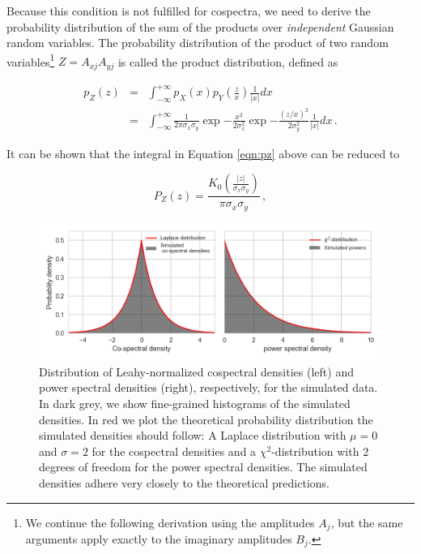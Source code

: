 \documentclass[12pt]{emulateapj}
\begin{document}
Because this condition is not fulfilled for cospectra, we need to derive the probability distribution of the sum of the products over \textit{independent} Gaussian random variables. The probability distribution of the product of two random variables\footnote{We continue the following derivation using the amplitudes $A_j$, but the same arguments apply exactly to the imaginary amplitudes $B_j$.} $Z = A_{xj}A_{yj}$ is called the product distribution, defined as 

\begin{eqnarray}
p_Z(z) & = & \int_{-\infty}^{+\infty}{p_X(x) p_Y(\frac{z}{x}) \frac{1}{|x|} dx} \\\nonumber
	   & = &  \int_{-\infty}^{+\infty}{\frac{1}{2 \pi \sigma_x \sigma_y} \exp{-\frac{x^2}{2\sigma_x^2}} \exp{-\frac{(z/x)^2}{2\sigma_y^2}} \frac{1}{|x|} dx} \label{eqn:pz} \, .
\end{eqnarray}

\noindent It can be shown \citep{watson1922,wishart1932} that the integral in Equation \ref{eqn:pz} above can be reduced to

\begin{equation}
\label{eqn:bessel}
P_Z(z) = \frac{K_0\left( \frac{|z|}{\sigma_x \sigma_y}\right)}{\pi \sigma_x \sigma_y} \, ,
\end{equation}

\begin{figure}
\begin{center}
\includegraphics[width=\textwidth]{cs_dist.png}
\caption{Distribution of Leahy-normalized cospectral densities (left) and power spectral densities (right), respectively, for the simulated data. In dark grey, we show fine-grained histograms of the simulated densities. In red we plot the theoretical probability distribution the simulated densities should follow: A Laplace distribution with $\mu=0$ and $\sigma=2$ for the cospectral densities and a $\chi^2$-distribution with $2$ degrees of freedom for the power spectral densities. The simulated densities adhere very closely to the theoretical predictions.}
\label{fig:csdist}
\end{center}
\end{figure}
\end{document}
